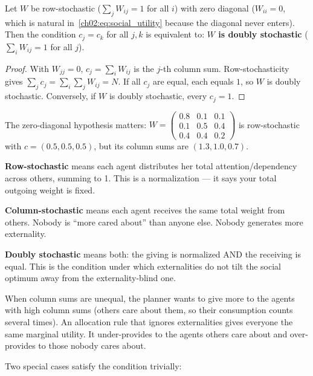 \documentclass[../structural_economics_book.tex]{subfiles}
\begin{document}
\begin{proposition}\label{ch02:prop:doubly_stochastic}
Let $W$ be row-stochastic ($\sum_j W_{ij} = 1$ for all $i$) with zero diagonal ($W_{ii} = 0$, which is natural in~\eqref{ch02:eq:social_utility} because the diagonal never enters). Then the condition $c_j = c_k$ for all $j, k$ is equivalent to: \textbf{$W$ is doubly stochastic} ($\sum_i W_{ij} = 1$ for all $j$).
\end{proposition}

\begin{proof}
With $W_{jj} = 0$, $c_j = \sum_i W_{ij}$ is the $j$-th column sum. Row-stochasticity gives $\sum_j c_j = \sum_i\sum_j W_{ij} = N$. If all $c_j$ are equal, each equals $1$, so $W$ is doubly stochastic. Conversely, if $W$ is doubly stochastic, every $c_j = 1$.
\end{proof}

The zero-diagonal hypothesis matters: $W = \begin{pmatrix} 0.8 & 0.1 & 0.1 \\ 0.1 & 0.5 & 0.4 \\ 0.4 & 0.4 & 0.2 \end{pmatrix}$ is row-stochastic with $c = (0.5, 0.5, 0.5)$, but its column sums are $(1.3, 1.0, 0.7)$.

\begin{intuition}
\textbf{Row-stochastic} means each agent distributes her total attention/dependency across others, summing to 1. This is a normalization --- it says your total outgoing weight is fixed.

\textbf{Column-stochastic} means each agent receives the same total weight from others. Nobody is ``more cared about'' than anyone else. Nobody generates more externality.

\textbf{Doubly stochastic} means both: the giving is normalized AND the receiving is equal. This is the condition under which externalities do not tilt the social optimum away from the externality-blind one.

When column sums are unequal, the planner wants to give more to the agents with high column sums (others care about them, so their consumption counts several times). An allocation rule that ignores externalities gives everyone the same marginal utility. It under-provides to the agents others care about and over-provides to those nobody cares about.
\end{intuition}

Two special cases satisfy the condition trivially:
\end{document}
